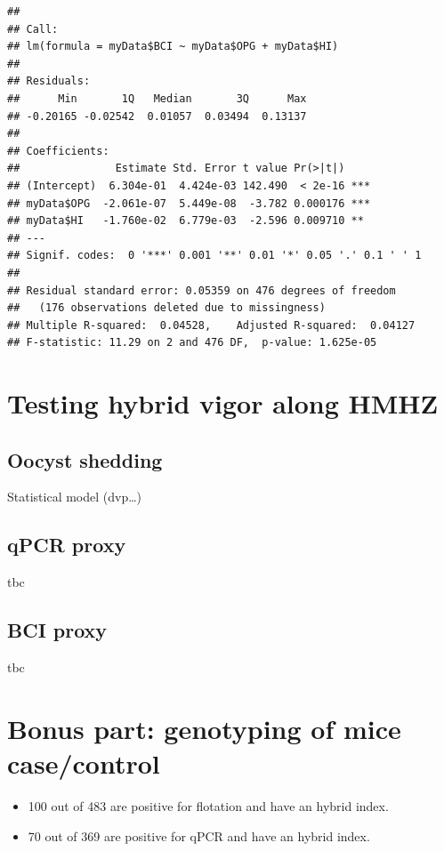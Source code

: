 \documentclass[]{article}
\begin{document}
\begin{verbatim}
## 
## Call:
## lm(formula = myData$BCI ~ myData$OPG + myData$HI)
## 
## Residuals:
##      Min       1Q   Median       3Q      Max 
## -0.20165 -0.02542  0.01057  0.03494  0.13137 
## 
## Coefficients:
##               Estimate Std. Error t value Pr(>|t|)    
## (Intercept)  6.304e-01  4.424e-03 142.490  < 2e-16 ***
## myData$OPG  -2.061e-07  5.449e-08  -3.782 0.000176 ***
## myData$HI   -1.760e-02  6.779e-03  -2.596 0.009710 ** 
## ---
## Signif. codes:  0 '***' 0.001 '**' 0.01 '*' 0.05 '.' 0.1 ' ' 1
## 
## Residual standard error: 0.05359 on 476 degrees of freedom
##   (176 observations deleted due to missingness)
## Multiple R-squared:  0.04528,    Adjusted R-squared:  0.04127 
## F-statistic: 11.29 on 2 and 476 DF,  p-value: 1.625e-05
\end{verbatim}

\section{Testing hybrid vigor along
HMHZ}\label{testing-hybrid-vigor-along-hmhz}

\subsection{Oocyst shedding}\label{oocyst-shedding}

Statistical model (dvp\ldots{})

\subsection{qPCR proxy}\label{qpcr-proxy}

tbc

\subsection{BCI proxy}\label{bci-proxy}

tbc

\section{Bonus part: genotyping of mice
case/control}\label{bonus-part-genotyping-of-mice-casecontrol}

\begin{itemize}
\item
  100 out of 483 are positive for flotation and have an hybrid index.
\item
  70 out of 369 are positive for qPCR and have an hybrid index.
\end{itemize}
\end{document}
